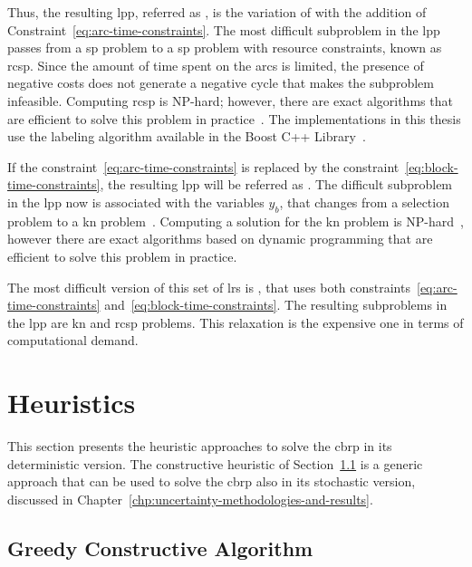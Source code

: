 Thus, the resulting \gls{lpp}, referred as {\lrcsp}, is the variation of {\lrsp} with the addition of
Constraint~\eqref{eq:arc-time-constraints}.
The most difficult subproblem in the \gls{lpp} passes from a \gls{sp} problem to a
\gls{sp} problem with resource constraints, known as \gls{rcsp}. Since the amount
of time spent on the arcs is limited, the presence of negative costs does not generate
a negative cycle that makes the subproblem infeasible. Computing \gls{rcsp} is NP-hard;
however, there are exact algorithms that are efficient to solve this problem in
practice~\cite{irnich:2006}. The implementations in this thesis use the labeling algorithm
available in the Boost C++ Library~\cite{boost:2020}.

If the constraint~\eqref{eq:arc-time-constraints} is replaced by
the constraint~\eqref{eq:block-time-constraints}, the resulting \gls{lpp} will be referred as {\lrkn}.
The difficult subproblem in the \gls{lpp} now is associated with the variables $y_b$, that changes
from a selection problem to a \gls{kn} problem~\cite{karp:1972}. Computing a solution for the \gls{kn} problem
is NP-hard~\cite{korte:2008}, however there are exact algorithms based on dynamic programming that are
efficient to solve this problem in practice.

The most difficult version of this set of \gls{lrs} is {\lrcspkn}, that uses both
constraints~\eqref{eq:arc-time-constraints} and~\eqref{eq:block-time-constraints}.
The resulting subproblems in the \gls{lpp} are \gls{kn} and \gls{rcsp} problems.
This relaxation is the expensive one in terms of computational demand.


\section{Heuristics}\label{sec:cbrp-constructive-heuristic}

This section presents the heuristic approaches to solve the \gls{cbrp} in its deterministic version. The constructive heuristic of Section~\ref{sec:greedy-constructive-algorithm} is a generic approach that can be used to solve the \gls{cbrp} also in its stochastic version, discussed in Chapter~\ref{chp:uncertainty-methodologies-and-results}.

\newcommand{\Call}[2]{\textit{#1}(#2)}

\subsection{Greedy Constructive Algorithm}\label{sec:greedy-constructive-algorithm}

